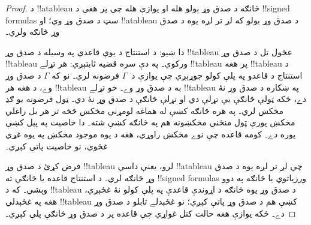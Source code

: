 \documentclass[../../../include/open-logic-section]{subfiles}
\begin{document}
\begin{proof}
د !!a{tableau} څانګه د صدق وړ بولو هله او يوازې هله چې پر هغې
د !!{signed formula}s سټ د صدق وړ وي؛ او !!a{tableau} د صدق
وړ بولو که لږ تر لږه يوه د صدق وړ څانګه ولري۔

دا ښيو: د استنتاج د يوې قاعدې په وسيله د صدق وړ !!{tableau}
غځول تل د صدق وړ !!{tableau} ورکوي۔ په دې سره قضيه ثابتېږي:
هر تړلے !!{tableau} پر هغه !!{tableau} د استنتاج د قاعدو په
پلې کولو جوړېږي چې يوازې د~$\Gamma$ فرضونه لري۔ نو که
$\Gamma$ د صدق وړ وے، د هغه هر !!{tableau} به د صدق وړ وے۔
خو تړلے !!{tableau} په ښکاره د صدق وړ نۀ دے، ځکه ټولې څانګې
يې تړلې دي او تړلې څانګې د صدق وړ نۀ دي۔ ټول فرضونه يو
ګډ مخکښ لري۔ په هره څانګه کښې له هماغه لومړني مخکښ څخه تر
هر بل راغلي مخکښ پورې ټول منځني مخکښونه هم په څانګه کښې
شته۔ دا خاصيت په پيل کښې پوره دے۔ کومه قاعده چې نوے مخکښ
راوړي، هغه د يوه موجود مخکښ په يوه غړي غځوي، نو خاصيت پاتې
کېږي۔

فرض کړئ د صدق وړ !!{tableau} لرو، يعنې داسې !!a{tableau} چې
لږ تر لږه يوه د صدق وړ څانګه لري۔ د استنتاج قاعده يا څانګې ته
!!{signed formula}s ورزياتوي يا څانګه په دوو وېشي۔ که د
!!{tableau} د صدق وړ يوه څانګه د اړوندې قاعدې په پلې کولو نۀ
غځېږي، هغه په غځېدلي !!{tableau} کښې هم د صدق وړ پاتې کېږي؛
نو غځېدلے تابلو د صدق وړ دے۔ ځکه يوازې هغه حالت کتل غواړي
چې قاعده پر د صدق وړ څانګې پلې کېږي۔


\end{proof}
\end{document}
